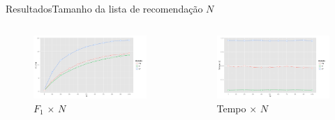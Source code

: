 \begin{frame}{Resultados}{Tamanho da lista de recomendação $N$}
\begin{columns}[b]
\begin{figure}[ht]
    \begin{center}
    \includegraphics[width=1.1\textwidth]{../img/F1_N}
    \end{center}
    \caption{$F_1$ $\times$ $N$}
    \label{fig:F1_N}
\end{figure}


\begin{figure}[ht]
    \begin{center}
    \includegraphics[width=1.1\textwidth]{../img/time_N}
    \end{center}
    \caption{Tempo $\times$ $N$}
    \label{fig:time_N}
\end{figure}
\end{columns}
\end{frame}

